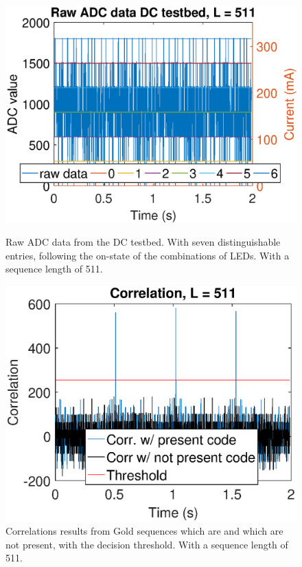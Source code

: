 \begin{figure}[!tbp]
  \centering
  \begin{minipage}[b]{0.49\textwidth}
    \includegraphics[width=\textwidth]{chapters/evaluation-chapters/hardware/dc/raw-dc-testbed-adc-data-n=9.eps}
    \caption{Raw ADC data from the DC testbed. With seven distinguishable entries, following the on-state of the combinations of LEDs. With a sequence length of 511.}
	\label{fig:raw-dc-testbed-adc-data-n=9}
  \end{minipage}
  \hfill
  \begin{minipage}[b]{0.49\textwidth}
    \includegraphics[width=\textwidth]{chapters/evaluation-chapters/hardware/dc/correlation-dc-testbed-n=9.eps}
    \caption{Correlations results from Gold sequences which are and which are not present, with the decision threshold. With a sequence length of 511.}
	\label{fig:correlation-dc-testbed-n=9}
  \end{minipage}
\end{figure}

